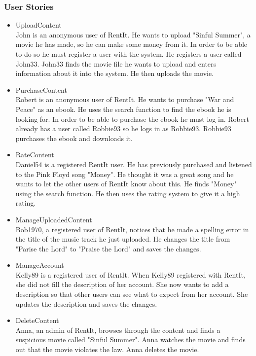 \subsubsection{User Stories}
\label{sec:User Stories}
\begin{itemize}
\item UploadContent \\
John is an anonymous user of RentIt. He wants to upload "Sinful Summer", a movie he has made, so he can make some money from it. In order to be able to do so he must register a user with the system. He registers a user called John33. John33 finds the movie file he wants to upload and enters information about it into the system. He then uploads the movie.
\item PurchaseContent \\
Robert is an anonymous user of RentIt. He wants to purchase "War and Peace" as an ebook. He uses the search function to find the ebook he is looking for. In order to be able to purchase the ebook he must log in. Robert already has a user called Robbie93 so he logs in as Robbie93. Robbie93 purchases the ebook and downloads it.
\item RateContent \\
Daniel54 is a registered RentIt user. He has previously purchased and listened to the Pink Floyd song "Money". He thought it was a great song and he wants to let the other users of RentIt know about this. He finds "Money" using the search function. He then uses the rating system to give it a high rating.
\item ManageUploadedContent \\
Bob1970, a registered user of RentIt, notices that he made a spelling error in the title of the music track he just uploaded. He changes the title from "Parise the Lord" to "Praise the Lord" and saves the changes.
\item ManageAccount \\
Kelly89 is a registered user of RentIt. When Kelly89 registered with RentIt, she did not fill the description of her account. She now wants to add a description so that other users can see what to expect from her account. She updates the description and saves the changes.
\item DeleteContent \\
Anna, an admin of RentIt, browses through the content and finds a suspicious movie called "Sinful Summer". Anna watches the movie and finds out that the movie violates the law. Anna deletes the movie.
\end{itemize}

%